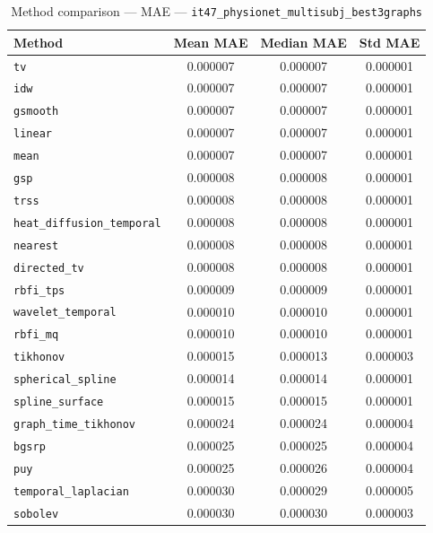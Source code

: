 \begin{table}[ht]
\centering
\caption{Method comparison — MAE — \texttt{it47_physionet_multisubj_best3graphs}}
\label{tab:mae_it47_physionet_multisubj_best3graphs}
\begin{tabular}{lccc}
\hline
Method & Mean MAE & Median MAE & Std MAE \\
\hline
\texttt{tv} & 0.000007 & 0.000007 & 0.000001 \\
\texttt{idw} & 0.000007 & 0.000007 & 0.000001 \\
\texttt{gsmooth} & 0.000007 & 0.000007 & 0.000001 \\
\texttt{linear} & 0.000007 & 0.000007 & 0.000001 \\
\texttt{mean} & 0.000007 & 0.000007 & 0.000001 \\
\texttt{gsp} & 0.000008 & 0.000008 & 0.000001 \\
\texttt{trss} & 0.000008 & 0.000008 & 0.000001 \\
\texttt{heat_diffusion_temporal} & 0.000008 & 0.000008 & 0.000001 \\
\texttt{nearest} & 0.000008 & 0.000008 & 0.000001 \\
\texttt{directed_tv} & 0.000008 & 0.000008 & 0.000001 \\
\texttt{rbfi_tps} & 0.000009 & 0.000009 & 0.000001 \\
\texttt{wavelet_temporal} & 0.000010 & 0.000010 & 0.000001 \\
\texttt{rbfi_mq} & 0.000010 & 0.000010 & 0.000001 \\
\texttt{tikhonov} & 0.000015 & 0.000013 & 0.000003 \\
\texttt{spherical_spline} & 0.000014 & 0.000014 & 0.000001 \\
\texttt{spline_surface} & 0.000015 & 0.000015 & 0.000001 \\
\texttt{graph_time_tikhonov} & 0.000024 & 0.000024 & 0.000004 \\
\texttt{bgsrp} & 0.000025 & 0.000025 & 0.000004 \\
\texttt{puy} & 0.000025 & 0.000026 & 0.000004 \\
\texttt{temporal_laplacian} & 0.000030 & 0.000029 & 0.000005 \\
\texttt{sobolev} & 0.000030 & 0.000030 & 0.000003 \\
\hline
\end{tabular}
\end{table}
